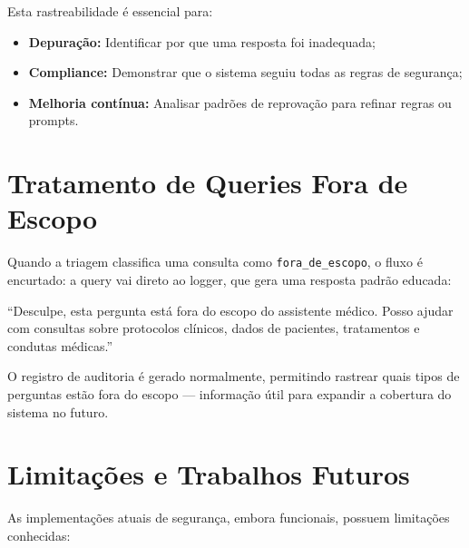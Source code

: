 Esta rastreabilidade é essencial para:

\begin{itemize}
    \item \textbf{Depuração:} Identificar por que uma resposta foi inadequada;
    \item \textbf{Compliance:} Demonstrar que o sistema seguiu todas as regras de segurança;
    \item \textbf{Melhoria contínua:} Analisar padrões de reprovação para refinar regras ou prompts.
\end{itemize}

\section{Tratamento de Queries Fora de Escopo}

Quando a triagem classifica uma consulta como \texttt{fora\_de\_escopo}, o fluxo é encurtado: a query vai direto ao logger, que gera uma resposta padrão educada:

\begin{infobox}
``Desculpe, esta pergunta está fora do escopo do assistente médico. Posso ajudar com consultas sobre protocolos clínicos, dados de pacientes, tratamentos e condutas médicas.''
\end{infobox}

O registro de auditoria é gerado normalmente, permitindo rastrear quais tipos de perguntas estão fora do escopo --- informação útil para expandir a cobertura do sistema no futuro.

\section{Limitações e Trabalhos Futuros}

As implementações atuais de segurança, embora funcionais, possuem limitações conhecidas:

